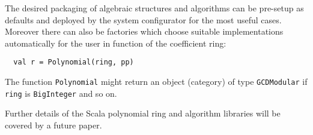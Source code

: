 \documentclass{llncs}
\newcommand{\code}[1]{\texttt{#1}}
\begin{document}
The desired packaging of algebraic structures and algorithms can be
pre-setup as defaults and deployed by the system configurator for the
most useful cases. Moreover there can also be factories which choose
suitable implementations automatically for the user in function of
the coefficient ring:
%
\begin{verbatim}
  val r = Polynomial(ring, pp)
\end{verbatim}
%
The function \code{Poly\-nomial} might return an object (category) of
type \code{GCD\-Modular} if \code{ring} is \code{Big\-Integer} and
so on.

Further details of the Scala polynomial ring and algorithm libraries
will be covered by a future paper.


%
%
%
%
%
\end{document}
